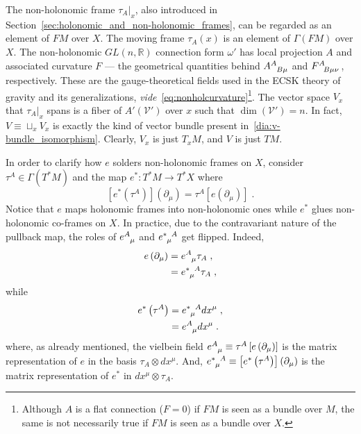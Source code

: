 \documentclass[../../main.tex]{subfiles}
\begin{document}
The non-holonomic frame $\tau_A|_x$, also introduced in Section~\ref{sec:holonomic_and_non-holonomic_frames}, can be regarded as an element of $FM$ over $X$. The moving frame $\tau_A\left(x\right)$ is an element of $\Gamma\left(FM\right)$ over $X$. The non-holonomic $GL\left(n,\mathbb{R}\right)$ connection form $\omega'$ has local projection $A$ and associated curvature $F$ --- the geometrical quantities behind $\tensor{A}{^A_{B\mu}}$ and $\tensor{F}{^A_{B\mu\nu}}$, respectively. These are the gauge-theoretical fields used in the ECSK theory of gravity and its generalizations, \textit{vide}~\eqref{eq:nonholcurvature}\footnote{Although $A$ is a flat connection ($F=0$) if $FM$ is seen as a bundle over $M$, the same is not necessarily true if $FM$ is seen as a bundle over $X$.}. The vector space $V_x$ that $\tau_A|_x$ spans is a fiber of $A'\left(\mathcal{V}'\right)$ over $x$ such that $\dim\left(\mathcal{V}'\right)=n$. In fact, $V\equiv \sqcup_x V_x$ is exactly the kind of vector bundle present in~\ref{dia:v-bundle_isomorphism}. Clearly, $V_x$ is just $T_x M$, and $V$ is just $TM$.

In order to clarify how $e$ solders non-holonomic frames on $X$, consider $\tau^A\in \Gamma\left(T^*M\right)$ and the map $e^*:T^*M \rightarrow T^*X$ where
\begin{equation}
  \label{eq:soldering_pullback}
  \left[e^*\left(\tau^A\right)\right]\left(\partial_\mu\right) = \tau^A\left[e\left(\partial_\mu\right)\right] \;.
\end{equation}
Notice that $e$ maps holonomic frames into non-holonomic ones while $e^*$ glues non-holonomic co-frames on $X$. In practice, due to the contravariant nature of the pullback map, the roles of $\tensor{e}{^A_\mu}$ and $\tensor{e}{^*_\mu^A}$ get flipped. Indeed,
\begin{align}
  \label{eq:holonomic-to-nonholonomic-frame}
  e \left(\partial_\mu\right) & = \tensor{e}{^A_\mu}\tau_A \;,\nonumber \\
                              & = \tensor{e}{^*_\mu^A}\tau_A \;,
\end{align}
while
\begin{align}
  \label{eq:nonholonomic-to-holonomic-coframe}
  e^* \left(\tau^A\right) & = \tensor{e}{^*_\mu^A}dx^\mu \;,\nonumber \\
                          & = \tensor{e}{^A_\mu}dx^\mu \;.
\end{align}
where, as already mentioned, the vielbein field $\tensor{e}{^A_\mu}\equiv \tau^A\left[e\left(\partial_\mu\right)\right]$ is the matrix representation of $e$ in the basis $\tau_A\otimes dx^\mu$. And, $\tensor{e}{^*_\mu^A}\equiv\left[e^*\left(\tau^A\right)\right]\left(\partial_\mu\right)$ is the matrix representation of $e^*$ in $dx^\mu\otimes\tau_A$.
\end{document}
